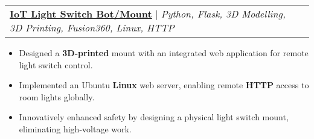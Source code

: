\documentclass[letterpaper]{article}
\makeatletter
\newcommand{\resumeItem}[1]{
  \item\small{
    {#1 \vspace{-2pt}}
  }
}
\newcommand{\resumeProjectHeading}[2]{
    \item
    \begin{tabular*}{0.97\textwidth}{l@{\extracolsep{\fill}}r}
      \small#1 & #2 \\
    \end{tabular*}\vspace{-7pt}
}
\newcommand{\resumeItemListStart}{\begin{itemize}}
\newcommand{\resumeItemListEnd}{\end{itemize}\vspace{-5pt}}
\makeatother
\begin{document}

\resumeProjectHeading
{\textbf{\href{https://www.gavintranquilino.com/light-switch.html}{\underline{IoT Light Switch Bot/Mount}}} $|$ \emph{Python, Flask, 3D Modelling, 3D Printing, Fusion360, Linux, HTTP}}{}
\resumeItemListStart
\resumeItem{Designed a \textbf{3D-printed} mount with an integrated web application for remote light switch control.}
\resumeItem{Implemented an Ubuntu \textbf{Linux} web server, enabling remote \textbf{HTTP} access to room lights globally.}
\resumeItem{Innovatively enhanced safety by designing a physical light switch mount, eliminating high-voltage work.}
\resumeItemListEnd




\end{document}
